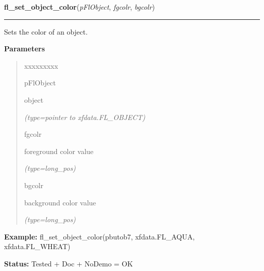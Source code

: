     \label{xformslib:flbasic:fl_set_object_color}

    \vspace{0.5ex}

\hspace{.8\funcindent}\begin{boxedminipage}{\funcwidth}

    \raggedright \textbf{fl\_set\_object\_color}(\textit{pFlObject}, \textit{fgcolr}, \textit{bgcolr})

    \vspace{-1.5ex}

    \rule{\textwidth}{0.5\fboxrule}
\setlength{\parskip}{2ex}
    Sets the color of an object.

\setlength{\parskip}{1ex}
      \textbf{Parameters}
      \vspace{-1ex}

      \begin{quote}
        \begin{Ventry}{xxxxxxxxx}

          \item[pFlObject]

          object

            {\it (type=pointer to xfdata.FL\_OBJECT)}

          \item[fgcolr]

          foreground color value

            {\it (type=long\_pos)}

          \item[bgcolr]

          background color value

            {\it (type=long\_pos)}

        \end{Ventry}

      \end{quote}

\textbf{Example:} fl\_set\_object\_color(pbutob7, xfdata.FL\_AQUA, xfdata.FL\_WHEAT)



\textbf{Status:} Tested + Doc + NoDemo = OK



    \end{boxedminipage}

    \label{xformslib:flbasic:fl_get_object_color}

